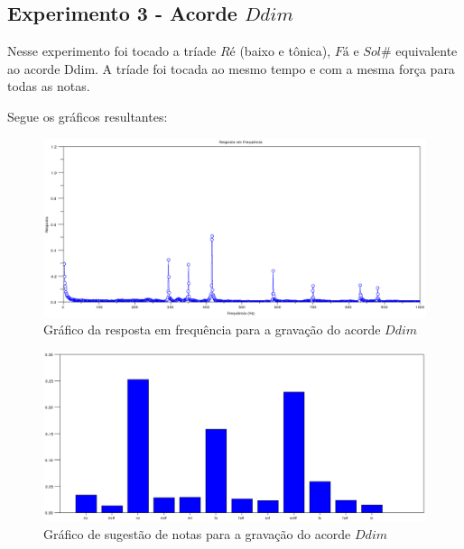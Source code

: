 \subsection{Experimento 3 - Acorde $Ddim$}
\label{sec:experimento3}

Nesse experimento foi tocado a tríade $Ré$ (baixo e tônica), $Fá$ e $Sol\#$ equivalente ao acorde Ddim. A tríade foi tocada ao mesmo tempo e com a mesma força para todas as notas.

Segue os gráficos resultantes:

\begin{figure}[h]
	\centering
		\includegraphics[keepaspectratio=true,scale=0.49]{figuras/Dm/fft_Ddim.eps}
	\caption{Gráfico da resposta em frequência para a gravação do acorde $Ddim$}
  \label{fig:espectro_Ddim}
\end{figure}

\begin{figure}[h]
	\centering
		\includegraphics[keepaspectratio=true,scale=0.45]{figuras/Dm/notas_Ddim.eps}
	\caption{Gráfico de sugestão de notas para a gravação do acorde $Ddim$}
  \label{fig:notas_Ddim}
\end{figure}

